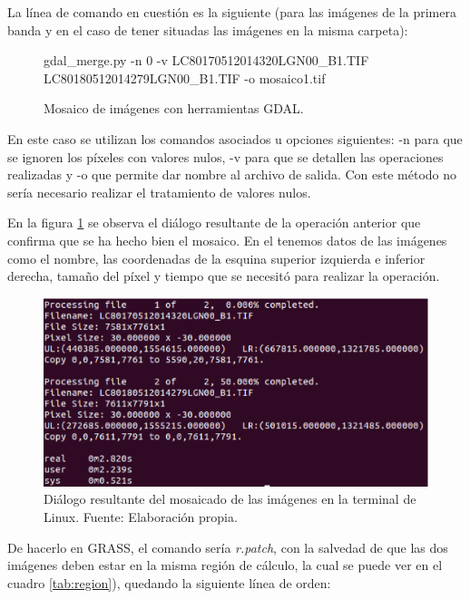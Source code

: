 La línea de comando en cuestión es la siguiente (para las imágenes de la primera banda y en el caso de tener situadas las imágenes en la misma carpeta):

\begin{figure}[h]
\centering
\begin{boxedverbatim}
	gdal_merge.py -n 0 -v LC80170512014320LGN00_B1.TIF 
	LC80180512014279LGN00_B1.TIF -o mosaico1.tif
\end{boxedverbatim}
\caption[Mosaico de imágenes]{Mosaico de imágenes con herramientas GDAL.}
\end{figure}

En este caso se utilizan los comandos asociados u opciones siguientes: -n para que se ignoren los píxeles con valores nulos, -v para que se detallen las operaciones realizadas y -o que permite dar nombre al archivo de salida. Con este método no sería necesario realizar el tratamiento de valores nulos.\Sep

En la figura \ref{fig:dialogomosaico} se observa el diálogo resultante de la operación anterior que confirma que se ha hecho bien el mosaico. En el tenemos datos de las imágenes como el nombre, las coordenadas de la esquina superior izquierda e inferior derecha, tamaño del píxel y tiempo que se necesitó para realizar la operación.\Sep

\begin{figure}
	\centering
	\includegraphics[width=0.8\linewidth]{./Imagenes/Dialogo_mosaico.eps}
	\caption[Diálogo del mosaicado]{Diálogo resultante del mosaicado de las imágenes en la terminal de Linux. Fuente: Elaboración propia.}
	\label{fig:dialogomosaico}
\end{figure}

De hacerlo en GRASS, el comando sería \textit{r.patch}, con la salvedad de que las dos imágenes deben estar en la misma región de cálculo, la cual se puede ver en el cuadro \ref{tab:region}), quedando la siguiente línea de orden:

